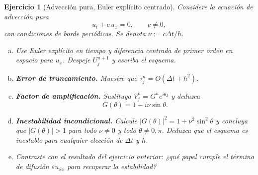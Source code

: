 \documentclass[12pt]{article}
\newtheorem{exercise}{Ejercicio}
\def\dt{\Delta t}
\begin{document}
\begin{exercise}[Advección pura, Euler explícito centrado]
Considere la ecuación de advección pura
\[
  u_t + c\,u_x = 0,\qquad c\ne 0,
\]
con condiciones de borde periódicas. Se denota $\nu:=c\dt/h$.
\begin{enumerate}[(a)]
\item Use Euler explícito en tiempo y diferencia centrada de primer orden en espacio para $u_x$. Despeje $U_j^{n+1}$ y escriba el esquema.

\item \textbf{Error de truncamiento.} Muestre que $\tau_j^n = O(\dt + h^2)$.

\item \textbf{Factor de amplificación.} Sustituya $V_j^n = G^n e^{i\theta j}$ y deduzca
\[
  G(\theta) = 1 - i\nu\sin\theta.
\]

\item \textbf{Inestabilidad incondicional.} Calcule $|G(\theta)|^2 = 1 + \nu^2\sin^2\theta$ y concluya que $|G(\theta)|>1$ para todo $\nu\ne 0$ y todo $\theta\ne 0,\pi$. Deduzca que el esquema es inestable para cualquier elección de $\dt$ y $h$.

\item Contraste con el resultado del ejercicio anterior: ¿qué papel cumple el término de difusión $\varepsilon u_{xx}$ para recuperar la estabilidad?
\end{enumerate}
\end{exercise}
\end{document}
